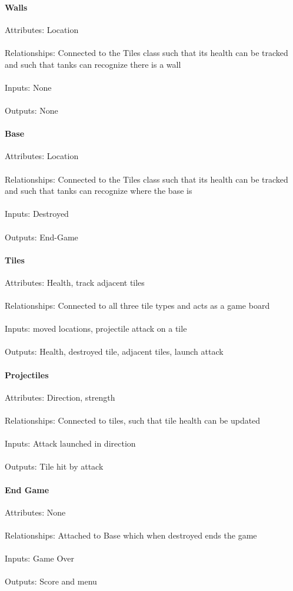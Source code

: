 \documentclass[12pt, titlepage]{article}
\begin{document}
\paragraph{Walls}
Attributes: Location
\\\\Relationships: Connected to the Tiles class such that its health can be 
tracked and such that tanks can recognize there is a wall
\\\\Inputs: None
\\\\Outputs: None
\paragraph{Base}
Attributes: Location
\\\\Relationships: Connected to the Tiles class such that its health can be 
tracked and such that tanks can recognize where the base is
\\\\Inputs: Destroyed
\\\\Outputs: End-Game
\paragraph{Tiles}
Attributes: Health, track adjacent tiles
\\\\Relationships: Connected to all three tile types and acts as a game board
\\\\Inputs: moved locations, projectile attack on a tile
\\\\Outputs: Health, destroyed tile, adjacent tiles, launch attack
\paragraph{Projectiles}
Attributes: Direction, strength
\\\\Relationships: Connected to tiles, such that tile health can be updated
\\\\Inputs: Attack launched in direction
\\\\Outputs: Tile hit by attack
\paragraph{End Game}
Attributes: None
\\\\Relationships: Attached to Base which when destroyed ends the game
\\\\Inputs: Game Over
\\\\Outputs: Score and menu
\end{document}
